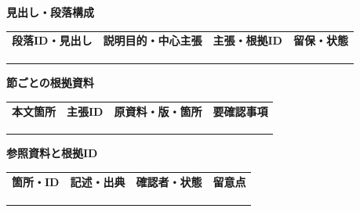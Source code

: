 \documentclass[11pt,a4paper]{article}
\begin{document}
\par{}\noindent\textbf{見出し・段落構成}\par\vspace{1mm}
{\fontsize{8.5}{13}\selectfont
\begin{tabularx}{\linewidth}{@{}XXXX@{}}
\textbf{段落ID・見出し} & \textbf{説明目的・中心主張} & \textbf{主張・根拠ID} & \textbf{留保・状態}\\[2mm]
\strut & \strut & \strut & \strut\\[5mm]
\strut & \strut & \strut & \strut\\[5mm]
\strut & \strut & \strut & \strut\\[5mm]
\end{tabularx}
}\vspace{2mm}\par
{}
\par{}\noindent\textbf{節ごとの根拠資料}\par\vspace{1mm}
{\fontsize{8.5}{13}\selectfont
\begin{tabularx}{\linewidth}{@{}XXXX@{}}
\textbf{本文箇所} & \textbf{主張ID} & \textbf{原資料・版・箇所} & \textbf{要確認事項}\\[2mm]
\strut & \strut & \strut & \strut\\[5mm]
\strut & \strut & \strut & \strut\\[5mm]
\strut & \strut & \strut & \strut\\[5mm]
\end{tabularx}
}\vspace{2mm}\par
{}
\par{}\noindent\textbf{参照資料と根拠ID}\par\vspace{1mm}
{\fontsize{8.5}{13}\selectfont
\begin{tabularx}{\linewidth}{@{}XXXX@{}}
\textbf{箇所・ID} & \textbf{記述・出典} & \textbf{確認者・状態} & \textbf{留意点}\\[2mm]
\strut & \strut & \strut & \strut\\[5mm]
\strut & \strut & \strut & \strut\\[5mm]
\strut & \strut & \strut & \strut\\[5mm]
\end{tabularx}
}\vspace{2mm}\par
\end{document}
